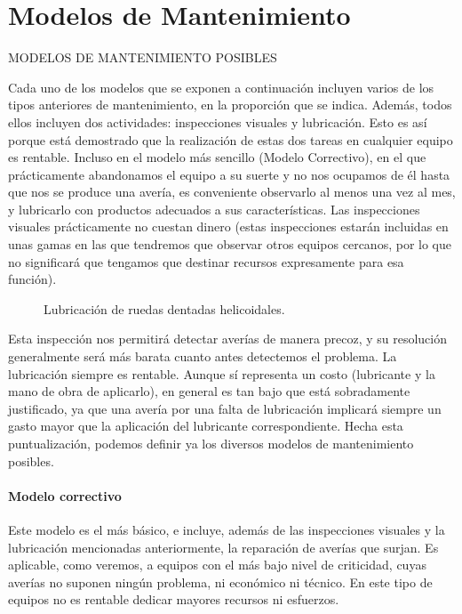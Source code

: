 \section{Modelos de Mantenimiento}

MODELOS DE MANTENIMIENTO POSIBLES

Cada uno de los modelos que se exponen a continuación incluyen varios
de los tipos anteriores de mantenimiento, en la proporción que se indica.
Además, todos ellos incluyen dos actividades: inspecciones visuales y lubricación. Esto es así porque está demostrado que la realización de estas dos
tareas en cualquier equipo es rentable. Incluso en el modelo más sencillo
(Modelo Correctivo), en el que prácticamente abandonamos el equipo a su
suerte y no nos ocupamos de él hasta que nos se produce una avería, es conveniente observarlo al menos una vez al mes, y lubricarlo con productos
adecuados a sus características. Las inspecciones visuales prácticamente
no cuestan dinero (estas inspecciones estarán incluidas en unas gamas en las
que tendremos que observar otros equipos cercanos, por lo que no significará que tengamos que destinar recursos expresamente para esa función).
\begin{figure}[h]
    \centering
    \caption{Lubricación de ruedas dentadas helicoidales.}
  
\end{figure}

Esta inspección nos permitirá detectar averías de manera precoz, y su resolución generalmente será más barata cuanto antes detectemos el problema.
La lubricación siempre es rentable. Aunque sí representa un costo (lubricante y la mano de obra de aplicarlo), en general es tan bajo que está sobradamente justificado, ya que una avería por una falta de lubricación implicará siempre un gasto mayor que la aplicación del lubricante
correspondiente.
Hecha esta puntualización, podemos definir ya los diversos modelos de
mantenimiento posibles.

\paragraph{Modelo correctivo}
Este modelo es el más básico, e incluye, además de las inspecciones visuales y la lubricación mencionadas anteriormente, la reparación de averías
que surjan. Es aplicable, como veremos, a equipos con el más bajo nivel de
criticidad, cuyas averías no suponen ningún problema, ni económico ni técnico. En este tipo de equipos no es rentable dedicar mayores recursos ni esfuerzos.


